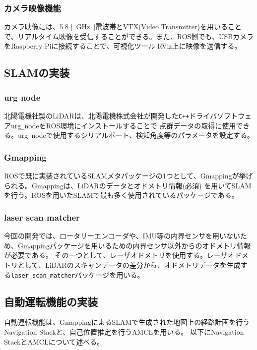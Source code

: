 \subsubsection{カメラ映像機能}
カメラ映像には、5.8 \si{[GHz]}電波帯とVTX(Video Transmitter)を用いることで、リアルタイム映像を受信することができる。また、ROS側でも、USBカメラをRaspberry Piに接続することで、可視化ツール
RViz上に映像を送信する。

\subsection{SLAMの実装}

\subsubsection{urg node}
北陽電機社製のLiDARは、北陽電機株式会社が開発した\verb|C++|ドライバソフトウェアurg\verb|_|nodeをROS環境にインストールすることで
点群データの取得に使用できる。urg\verb|_|nodeで使用するシリアルポート、検知角度等のパラメータを設定する。

\subsubsection{Gmapping}
ROSで既に実装されているSLAMメタパッケージの1つとして、Gmappingが挙げられる。Gmappingは、LiDARのデータとオドメトリ情報(必須)
を用いてSLAMを行う。ROSを用いたSLAMで最も多く使用されているパッケージである。

\subsubsection{laser scan matcher}
今回の開発では、ロータリーエンコーダや、IMU等の内界センサを用いないため、Gmappingパッケージを用いるための内界センサ以外からのオドメトリ情報が必要である。
その一つとして、レーザオドメトリを使用する。レーザオドメトリとして、LiDARのスキャンデータの差分から、オドメトリデータを生成する\verb|laser_scan_matcher|パッケージを用いる。

\subsection{自動運転機能の実装}
自動運転機能は、GmappingによるSLAMで生成された地図上の経路計画を行うNavigation Stack\cite{auto:navstack}と、自己位置推定を行うAMCL\cite{auto:amcl}を用いる。
以下にNavigation StackとAMCLについて述べる。

